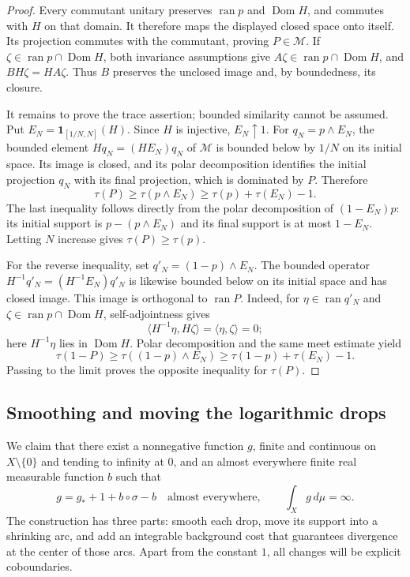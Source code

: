 \begin{proof}
Every commutant unitary preserves $\operatorname{ran}p$ and
$\operatorname{Dom}H$, and commutes with $H$ on that domain.  It therefore
maps the displayed closed space onto itself.  Its projection commutes with
the commutant, proving $P\in\mathcal M$.  If
$\zeta\in\operatorname{ran}p\cap\operatorname{Dom}H$, both invariance
assumptions give
$A\zeta\in\operatorname{ran}p\cap\operatorname{Dom}H$, and
$BH\zeta=HA\zeta$.  Thus $B$ preserves the unclosed image and, by
boundedness, its closure.

It remains to prove the trace assertion; bounded similarity cannot be
assumed.  Put $E_N=\mathbf1_{[1/N,N]}(H)$.  Since $H$ is injective,
$E_N\uparrow1$.  For $q_N=p\wedge E_N$, the bounded element $Hq_N=(HE_N)q_N$ of
$\mathcal M$ is bounded below by $1/N$ on its initial space.  Its image is
closed, and its polar decomposition identifies the initial projection
$q_N$ with its final projection, which is dominated by $P$.  Therefore
\[
 \tau(P)\ge\tau(p\wedge E_N)
 \ge\tau(p)+\tau(E_N)-1.
\]
The last inequality follows directly from the polar decomposition of
$(1-E_N)p$: its initial support is $p-(p\wedge E_N)$ and its final support
is at most $1-E_N$.  Letting $N$ increase gives $\tau(P)\ge\tau(p)$.

For the reverse inequality, set $q'_N=(1-p)\wedge E_N$.  The bounded
operator $H^{-1}q'_N=(H^{-1}E_N)q'_N$ is likewise bounded below on its initial space and
has closed image.  This image is orthogonal to $\operatorname{ran}P$.
Indeed, for $\eta\in\operatorname{ran}q'_N$ and
$\zeta\in\operatorname{ran}p\cap\operatorname{Dom}H$, self-adjointness
gives
\[
 \langle H^{-1}\eta,H\zeta\rangle=\langle\eta,\zeta\rangle=0;
\]
here $H^{-1}\eta$ lies in $\operatorname{Dom}H$.  Polar decomposition and
the same meet estimate yield
\[
 \tau(1-P)\ge\tau((1-p)\wedge E_N)
 \ge\tau(1-p)+\tau(E_N)-1.
\]
Passing to the limit proves the opposite inequality for $\tau(P)$.
\end{proof}

\subsection{Smoothing and moving the logarithmic drops}

We claim that there exist a nonnegative function $g$, finite and continuous
on $X\setminus\{0\}$ and tending to infinity at $0$, and an almost
everywhere finite real measurable function $b$ such that
\begin{equation}\label{eq:continuous-coboundary}
 g=g_*+1+b\circ\sigma-b\quad\text{almost everywhere},
 \qquad \int_Xg\,d\mu=\infty.
\end{equation}
The construction has three parts: smooth each drop, move its support into
a shrinking arc, and add an integrable background cost that guarantees
divergence at the center of those arcs.  Apart from the constant $1$, all changes will be explicit
coboundaries.

